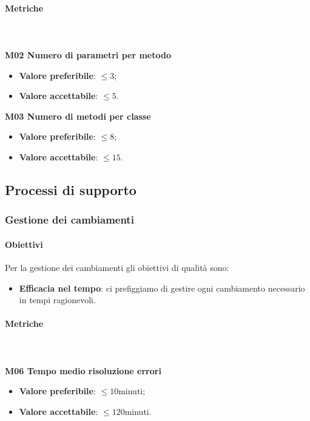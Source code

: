 			\paragraph{Metriche} \mbox{} \\ \\
			\textbf{M02 Numero di parametri per metodo} 
			\begin{itemize}
				\item \textbf{Valore preferibile}: $ \le 3$;
				\item \textbf{Valore accettabile}: $ \le 5$.
			\end{itemize}			
			\textbf{M03 Numero di metodi per classe} 
			\begin{itemize}
				\item \textbf{Valore preferibile}: $ \le 8$;
				\item \textbf{Valore accettabile}: $ \le 15$.
			\end{itemize}
	
			
	\subsection{Processi di supporto}
		\subsubsection{Gestione dei cambiamenti}
			\paragraph{Obiettivi}
			Per la gestione dei cambiamenti gli obiettivi di qualità sono:
			\begin{itemize}
				\item \textbf{Efficacia nel tempo}: ci prefiggiamo di gestire ogni cambiamento necessario in tempi ragionevoli.
			\end{itemize}
			\paragraph{Metriche} \mbox{} \\ \\
			\textbf{M06 Tempo medio risoluzione errori}
			\begin{itemize}
				\item \textbf{Valore preferibile}: $\le 10$minuti;
				\item \textbf{Valore accettabile}: $\le 120$minuti.
			\end{itemize}			
